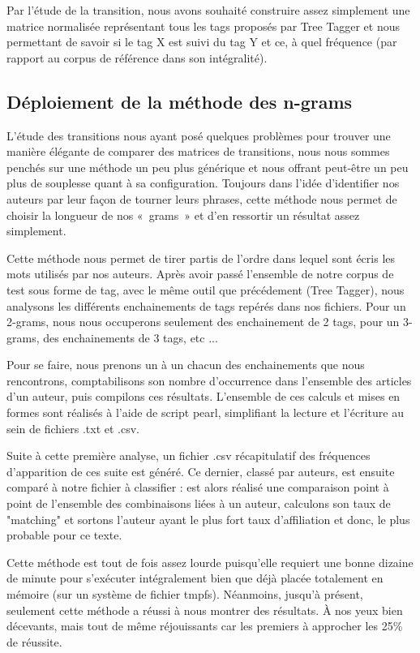 \documentclass[a4paper]{article}
\begin{document}
Par l'étude de la transition, nous avons souhaité construire assez simplement une matrice normalisée représentant tous les tags proposés par Tree Tagger et nous permettant de savoir si le tag X est suivi du tag Y et ce, à quel fréquence (par rapport au corpus de référence dans son intégralité).


\subsection{Déploiement de la méthode des n-grams}

L'étude des transitions nous ayant posé quelques problèmes pour trouver une manière élégante de comparer des matrices de transitions, nous nous sommes penchés sur une méthode un peu plus générique et nous offrant peut-être un peu plus de souplesse quant à sa configuration. Toujours dans l'idée d'identifier nos auteurs par leur façon de tourner leurs phrases, cette méthode nous permet de choisir la longueur de nos «~grams~» et d'en ressortir un résultat assez simplement.

Cette méthode nous permet de tirer partis de l'ordre dans lequel sont écris les mots utilisés par nos auteurs. Après avoir passé l'ensemble de notre corpus de test sous forme de tag, avec le même outil que précédement (Tree Tagger), nous analysons les différents enchainements de tags repérés dans nos fichiers. Pour un 2-grams, nous nous occuperons seulement des enchainement de 2 tags, pour un 3-grams, des enchainements de 3 tags, etc ...

Pour se faire, nous prenons un à un chacun des enchainements que nous rencontrons, comptabilisons son nombre d'occurrence dans l'ensemble des articles d'un auteur, puis compilons ces résultats. L'ensemble de ces calculs et mises en formes sont réalisés à l'aide de script pearl, simplifiant la lecture et l'écriture au sein de fichiers .txt et .csv.

Suite à cette première analyse, un fichier .csv récapitulatif des fréquences d'apparition de ces suite est généré. Ce dernier, classé par auteurs, est ensuite comparé à notre fichier à classifier : est alors réalisé une comparaison point à point de l'ensemble des combinaisons liées à un auteur, calculons son taux de "matching" et sortons l'auteur ayant le plus fort taux d'affiliation et donc, le plus probable pour ce texte. 

Cette méthode est tout de fois assez lourde puisqu'elle requiert une bonne dizaine de minute pour s'exécuter intégralement bien que déjà placée totalement en mémoire (sur un système de fichier tmpfs). Néanmoins, jusqu'à présent, seulement cette méthode a réussi à nous montrer des résultats. À nos yeux bien décevants, mais tout de même réjouissants car les premiers à approcher les 25\% de réussite.
\end{document}

